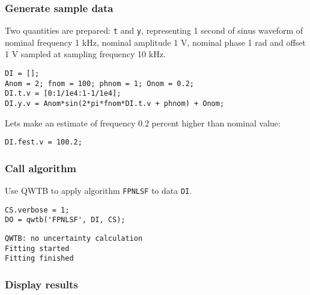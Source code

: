 \startcontents[localtoc]



{}
\subsubsection*{Generate sample data}



Two quantities are prepared: \texttt{t} and \texttt{y}, representing 1 second of sinus waveform of nominal
frequency 1 kHz, nominal amplitude 1 V, nominal phase 1 rad and offset 1 V sampled at sampling
frequency 10 kHz.

\begin{lstlisting}
DI = [];
Anom = 2; fnom = 100; phnom = 1; Onom = 0.2;
DI.t.v = [0:1/1e4:1-1/1e4];
DI.y.v = Anom*sin(2*pi*fnom*DI.t.v + phnom) + Onom;
\end{lstlisting}


Lets make an estimate of frequency 0.2 percent higher than nominal value:

\begin{lstlisting}
DI.fest.v = 100.2;
\end{lstlisting}


{}
\subsubsection*{Call algorithm}



Use QWTB to apply algorithm \texttt{FPNLSF} to data \texttt{DI}.

\begin{lstlisting}
CS.verbose = 1;
DO = qwtb('FPNLSF', DI, CS);
\end{lstlisting}
\begin{lstlisting}[language={},xleftmargin=5pt,frame=none]
QWTB: no uncertainty calculation
Fitting started
Fitting finished

\end{lstlisting}


{}
\subsubsection*{Display results}



